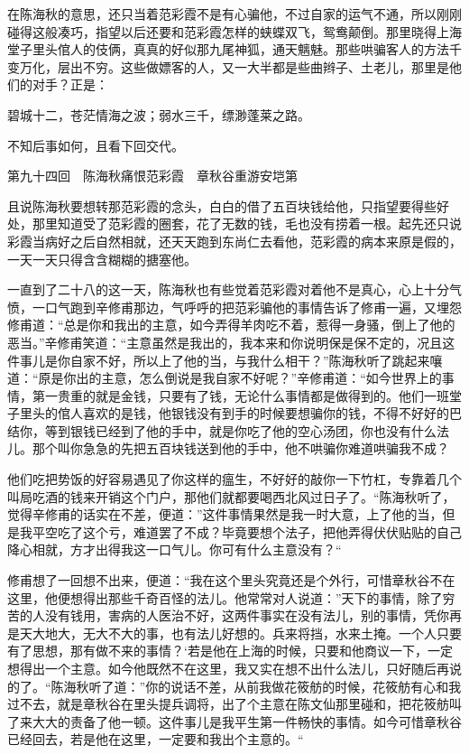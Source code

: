\documentclass[12pt,UTF8]{ctexbook}
\begin{document}
{{{在陈海秋的意思，还只当着范彩霞不是有心骗他，不过自家的运气不通，所以刚刚碰得这般凑巧，指望以后还要和范彩霞怎样的蛱蝶双飞，鸳鸯颠倒。那里晓得上海堂子里头倌人的伎俩，真真的好似那九尾神狐，通天魑魅。那些哄骗客人的方法千变万化，层出不穷。这些做嫖客的人，又一大半都是些曲辫子、土老儿，那里是他们的对手？正是：

碧城十二，苍茫情海之波；弱水三千，缥渺蓬莱之路。

不知后事如何，且看下回交代。





第九十四回　陈海秋痛恨范彩霞　章秋谷重游安垲第



且说陈海秋要想转那范彩霞的念头，白白的借了五百块钱给他，只指望要得些好处，那里知道受了范彩霞的圈套，花了无数的钱，毛也没有捞着一根。起先还只说彩霞当病好之后自然相就，还天天跑到东尚仁去看他，范彩霞的病本来原是假的，一天一天只得含含糊糊的搪塞他。

一直到了二十八的这一天，陈海秋也有些觉着范彩霞对着他不是真心，心上十分气愤，一口气跑到辛修甫那边，气呼呼的把范彩骗他的事情告诉了修甫一遍，又埋怨修甫道：“总是你和我出的主意，如今弄得羊肉吃不着，惹得一身骚，倒上了他的恶当。”辛修甫笑道：“主意虽然是我出的，我本来和你说明保是保不定的，况且这件事儿是你自家不好，所以上了他的当，与我什么相干？”陈海秋听了跳起来嚷道：“原是你出的主意，怎么倒说是我自家不好呢？”辛修甫道：“如今世界上的事情，第一贵重的就是金钱，只要有了钱，无论什么事情都是做得到的。他们一班堂子里头的倌人喜欢的是钱，他银钱没有到手的时候要想骗你的钱，不得不好好的巴结你，等到银钱已经到了他的手中，就是你吃了他的空心汤团，你也没有什么法儿。那个叫你急急的先把五百块钱送到他的手中，他不哄骗你难道哄骗我不成？

他们吃把势饭的好容易遇见了你这样的瘟生，不好好的敲你一下竹杠，专靠着几个叫局吃酒的钱来开销这个门户，那他们就都要喝西北风过日子了。“陈海秋听了，觉得辛修甫的话实在不差，便道：”这件事情果然是我一时大意，上了他的当，但是我平空吃了这个亏，难道罢了不成？毕竟要想个法子，把他弄得伏伏贴贴的自己降心相就，方才出得我这一口气儿。你可有什么主意没有？“

修甫想了一回想不出来，便道：“我在这个里头究竟还是个外行，可惜章秋谷不在这里，他便想得出那些千奇百怪的法儿。他常常对人说道：”天下的事情，除了穷苦的人没有钱用，害病的人医治不好，这两件事实在没有法儿，别的事情，凭你再是天大地大，无大不大的事，也有法儿好想的。兵来将挡，水来土掩。一个人只要有了思想，那有做不来的事情？‘若是他在上海的时候，只要和他商议一下，一定想得出一个主意。如今他既然不在这里，我又实在想不出什么法儿，只好随后再说的了。“陈海秋听了道：”你的说话不差，从前我做花筱舫的时候，花筱舫有心和我过不去，就是章秋谷在里头提兵调将，出了个主意在陈文仙那里碰和，把花筱舫叫了来大大的责备了他一顿。这件事儿是我平生第一件畅快的事情。如今可惜章秋谷已经回去，若是他在这里，一定要和我出个主意的。“

}}}
\end{document}
